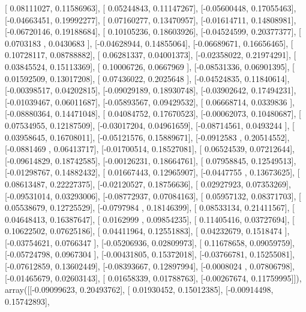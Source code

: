 \documentclass{article}
\begin{document}
       [ 0.08111027,  0.11586963],
       [ 0.05244843,  0.11147267],
       [-0.05600448,  0.17055463],
       [-0.04663451,  0.19992277],
       [ 0.07160277,  0.13470957],
       [-0.01614711,  0.14808981],
       [-0.06720146,  0.19188684],
       [ 0.10105236,  0.18603926],
       [-0.04524599,  0.20377377],
       [ 0.0703183 ,  0.0430683 ],
       [-0.04628944,  0.14855064],
       [-0.06689671,  0.16656465],
       [ 0.10728117,  0.08788882],
       [ 0.06281337,  0.04001373],
       [-0.02358022,  0.21974291],
       [ 0.03845524,  0.15113369],
       [ 0.10006726,  0.0667969 ],
       [-0.08531336,  0.06901395],
       [ 0.01592509,  0.13017208],
       [ 0.07436022,  0.2025648 ],
       [-0.04524835,  0.11840614],
       [-0.00398517,  0.04202815],
       [-0.09029189,  0.18930748],
       [-0.03902642,  0.17494231],
       [-0.01039467,  0.06011687],
       [-0.05893567,  0.09429532],
       [ 0.06668714,  0.0339836 ],
       [-0.08880364,  0.14471048],
       [ 0.04084752,  0.17670523],
       [-0.00062073,  0.10480687],
       [ 0.07534955,  0.12187509],
       [-0.03017204,  0.04961659],
       [-0.08714561,  0.0493244 ],
       [ 0.03958645,  0.16708011],
       [-0.05121576,  0.15889671],
       [-0.0912583 ,  0.20514552],
       [-0.0881469 ,  0.06413717],
       [-0.01700514,  0.18527081],
       [ 0.06524539,  0.07212644],
       [-0.09614829,  0.18742585],
       [-0.00126231,  0.18664761],
       [ 0.07958845,  0.12549513],
       [-0.01298767,  0.14882432],
       [ 0.01667443,  0.12965907],
       [-0.0447755 ,  0.13673625],
       [ 0.08613487,  0.22227375],
       [-0.02120527,  0.18756636],
       [ 0.02927923,  0.07353269],
       [-0.09531014,  0.03293006],
       [-0.08772937,  0.07084163],
       [ 0.05957132,  0.08371703],
       [ 0.05538679,  0.12725529],
       [-0.0797984 ,  0.18146399],
       [ 0.08533134,  0.21411567],
       [ 0.04648413,  0.16387647],
       [ 0.0162999 ,  0.09854235],
       [ 0.11405416,  0.03727694],
       [ 0.10622502,  0.07625186],
       [ 0.04411964,  0.12551883],
       [ 0.04232679,  0.1518474 ],
       [-0.03754621,  0.0766347 ],
       [-0.05206936,  0.02809973],
       [ 0.11678658,  0.09059759],
       [-0.05724798,  0.0967304 ],
       [-0.00431805,  0.15372018],
       [-0.03766781,  0.15255081],
       [-0.07612859,  0.13602449],
       [-0.08393667,  0.12897994],
       [-0.0008024 ,  0.07806798],
       [-0.01465679,  0.02603143],
       [ 0.01658339,  0.01788763],
       [-0.00267674,  0.11759995]]), array([[-0.09099623,  0.20493762],
       [ 0.01930452,  0.15012385],
       [-0.00914498,  0.15742893],
\end{document}
